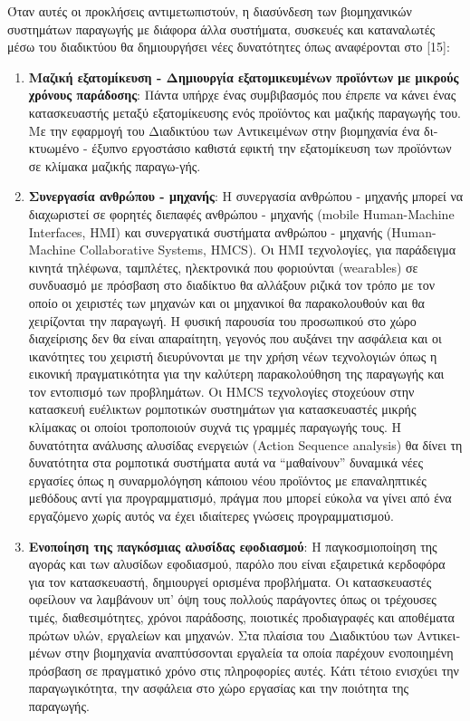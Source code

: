 Όταν αυτές οι προκλήσεις αντιμετωπιστούν, η διασύνδεση των βιομηχανικών συστημάτων παραγωγής με διάφορα άλλα συστήματα, συσκευές και καταναλωτές μέσω του διαδικτύου θα δημιουργήσει νέες δυνατότητες όπως αναφέρονται στο [15]: 

\begin{enumerate}
	\item{\textbf{Μαζική εξατομίκευση - Δημιουργία εξατομικευμένων προϊόντων με μικρούς χρόνους παράδοσης}: Πάντα υπήρχε ένας συμβιβασμός που έπρεπε να κάνει ένας κατασκευαστής μεταξύ εξατομίκευσης ενός προϊόντος και μαζικής παραγωγής του. Με την εφαρμογή του Δια­δικτύου των Αντικειμένων στην βιομηχανία ένα δι­κτυωμένο - έξυπνο εργοστάσιο καθιστά εφικτή την εξατομίκευση των προϊόντων σε κλίμακα μαζικής πα­ραγω-γής.}
	\item{\textbf{Συνεργασία ανθρώπου - μηχανής}: Η συνεργασία ανθρώπου - μηχανής μπορεί να διαχωριστεί σε φορητές διεπαφές ανθρώπου - μηχανής (mobile Hu­man-Machine Interfaces, HMI) και συνεργατικά συστήματα ανθρώπου - μηχανής (Human-Machine Collaborative Systems, HMCS). Οι HMI τεχνολογίες, για παράδειγμα κινητά τηλέφωνα, ταμπλέτες, ηλεκτρονικά που φοριούνται (wearables) σε συνδυασμό με πρόσβαση στο διαδίκτυο θα αλλάξουν ριζικά τον τρόπο με τον οποίο οι χειρι­στές των μηχανών και οι μηχανικοί θα παρακολουθούν και θα χειρίζονται την παραγωγή. Η φυσική παρουσία του προσωπικού στο χώρο διαχείρισης δεν θα είναι απαραίτητη, γεγονός που αυξάνει την ασφάλεια και οι ικανότητες του χειριστή διευρύνονται με την χρήση νέων τεχνολογιών όπως η εικονική πραγματικότητα για την καλύτερη παρακολούθηση της παραγωγής και τον εντοπισμό των προβλημάτων. Οι HMCS τεχνολογί­ες στοχεύουν στην κατασκευή ευέλικτων ρομποτικών συστημάτων για κατασκευαστές μικρής κλίμακας οι οποίοι τροποποιούν συχνά τις γραμμές παραγωγής τους. Η δυνατότητα ανάλυσης αλυσίδας ενεργειών (Action Sequence analysis) θα δίνει τη δυνατότητα στα ρομποτικά συστήματα αυτά να “μαθαίνουν” δυναμικά νέες εργασίες όπως η συναρμολόγηση κάποιου νέου προϊόντος με επαναληπτικές μεθόδους αντί για προ­γραμματισμό, πράγμα που μπορεί εύκολα να γίνει από ένα εργαζόμενο χωρίς αυτός να έχει ιδιαίτερες γνώσεις προγραμματισμού. }
	\item{\textbf{Ενοποίηση της παγκόσμιας αλυσίδας εφοδιασμού}: Η παγκοσμιοποίηση της αγοράς και των αλυσίδων εφοδιασμού, παρόλο που είναι εξαιρετικά κερδοφόρα για τον κατασκευαστή, δημιουργεί ορισμένα προβλήματα. Οι κατασκευαστές οφείλουν να λαμβάνουν υπ’ όψη τους πολλούς παράγοντες όπως οι τρέχουσες τιμές, διαθεσιμότητες, χρόνοι παράδοσης, ποιοτικές προδια­γραφές και αποθέματα πρώτων υλών, εργαλείων και μηχανών. Στα πλαίσια του Διαδικτύου των Αντικει­μένων στην βιομηχανία αναπτύσσονται εργαλεία τα οποία παρέχουν ενοποιημένη πρόσβαση σε πραγματικό χρόνο στις πληροφορίες αυτές. Κάτι τέτοιο ενισχύει την παραγωγικότητα, την ασφάλεια στο χώρο εργασίας και την ποιότητα της παραγωγής.}
\end{enumerate}

